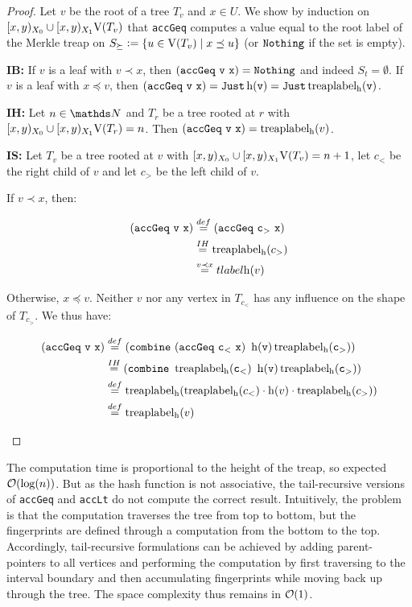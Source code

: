 \begin{proof}
Let $v$ be the root of a tree $T_v$ and $x \in U$. We show by induction on $[{x},{y})_{X_0} \cup [{x},{y})_{X_1}{\operatorname{V}(T_v)}$ that \texttt{accGeq} computes a value equal to the root label of the Merkle treap on $S_{\succeq} \vcentcolon= \{u \in \operatorname{V}(T_v) \mid x \preceq u\}$ (or $\mathtt{Nothing}$ if the set is empty).

\textbf{IB:} If $v$ is a leaf with $v \prec x$, then $\mathtt{(accGeq\ v\ x)} = \mathtt{Nothing}$ and indeed $S_{t} = \emptyset$. If $v$ is a leaf with $x \preceq v$, then $\mathtt{(accGeq\ v\ x)} =  \mathtt{Just \operatorname{h}(v)} = \mathtt{Just \operatorname{treaplabel_{\operatorname{h}}}(v)}$.

\textbf{IH:} Let  $n \in \N$ and $T_r$ be a tree rooted at $r$ with $[{x},{y})_{X_0} \cup [{x},{y})_{X_1}{\operatorname{V}(T_r)} = n$. Then $\mathtt{(accGeq\ v\ x)} = \operatorname{treaplabel_{\operatorname{h}}}(v)$.

\textbf{IS:} Let $T_v$ be a tree rooted at $v$ with $[{x},{y})_{X_0} \cup [{x},{y})_{X_1}{\operatorname{V}(T_v)} = n + 1$, let $c_{<}$ be the right child of $v$  and let $c_
{>}$ be the left child of $v$.

\begin{caselist}
\case If $v \prec x$, then:

\begin{align*}
\mathtt{(accGeq\ v\ x)} &\overset{def}= \mathtt{(accGeq\ c_{>}\ x)}\\
&\overset{IH}= \tlabel{\h}(c_{>})\\
&\overset{v \prec x}= tlabel{\h}(v)\\
\end{align*}

\case Otherwise, $x \preceq v$. Neither $v$ nor any vertex in $T_{c_{<}}$ has any influence on the shape of $T_{c_{>}}$. We thus have:

\begin{align*}
\mathtt{(accGeq\ v\ x)} &\overset{def}= \mathtt{(combine\ (accGeq\ c_{<}\ x)\ \h(v) \tlabel{\h}(c_{>}))}\\
&\overset{IH}= \mathtt{(combine\ \tlabel{\h}(c_{<})\ \h(v) \tlabel{\h}(c_{>}))}\\
&\overset{def}= \tlabel{\h}(\tlabel{\h}(c_{<}) \concatenate \h(v) \concatenate \tlabel{\h}(c_{>}))\\
&\overset{def}= \tlabel{\h}(v)\\
\end{align*}
\end{caselist}
\end{proof}

The computation time is proportional to the height of the treap, so expected $\mathcal{O}(\log(n))$. But as the hash function is not associative, the tail-recursive versions of \texttt{accGeq} and \texttt{accLt} do not compute the correct result. Intuitively, the problem is that the computation traverses the tree from top to bottom, but the fingerprints are defined through a computation from the bottom to the top. Accordingly, tail-recursive formulations can be achieved by adding parent-pointers to all vertices and performing the computation by first traversing to the interval boundary and then accumulating fingerprints while moving back up through the tree. The space complexity thus remains in $\mathcal{O}(1)$.

